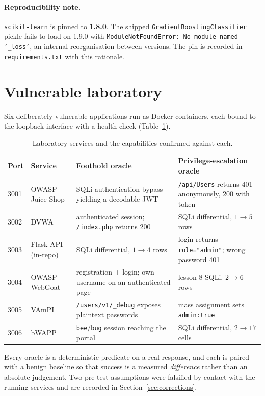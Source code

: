 \documentclass[11pt,a4paper]{report}
\newcommand{\code}[1]{\texttt{\small #1}}
\begin{document}
\paragraph{Reproducibility note.} \code{scikit-learn} is pinned to \textbf{1.8.0}.
The shipped \code{GradientBoostingClassifier} pickle fails to load on 1.9.0 with
\code{ModuleNotFoundError: No module named '\_loss'}, an internal reorganisation
between versions. The pin is recorded in \code{requirements.txt} with this
rationale.

\section{Vulnerable laboratory}
Six deliberately vulnerable applications run as Docker containers, each bound to
the loopback interface with a health check (Table~\ref{tab:lab}).

\begin{table}[h]
\centering
\caption{Laboratory services and the capabilities confirmed against each.}
\label{tab:lab}
\small
\begin{tabularx}{\textwidth}{llXX}
\toprule
\textbf{Port} & \textbf{Service} & \textbf{Foothold oracle} & \textbf{Privilege-escalation oracle}\\
\midrule
3001 & OWASP Juice Shop & SQLi authentication bypass yielding a decodable JWT & \code{/api/Users} returns 401 anonymously, 200 with token \\
3002 & DVWA & authenticated session; \code{/index.php} returns 200 & SQLi differential, $1 \rightarrow 5$ rows \\
3003 & Flask API (in-repo) & SQLi differential, $1 \rightarrow 4$ rows & login returns \code{role="admin"}; wrong password 401 \\
3004 & OWASP WebGoat & registration + login; own username on an authenticated page & lesson-8 SQLi, $2 \rightarrow 6$ rows \\
3005 & VAmPI & \code{/users/v1/\_debug} exposes plaintext passwords & mass assignment sets \code{admin:true} \\
3006 & bWAPP & \code{bee}/\code{bug} session reaching the portal & SQLi differential, $2 \rightarrow 17$ cells \\
\bottomrule
\end{tabularx}
\end{table}

Every oracle is a deterministic predicate on a real response, and each is paired
with a benign baseline so that success is a measured \emph{difference} rather
than an absolute judgement. Two pre-test assumptions were falsified by contact
with the running services and are recorded in Section~\ref{sec:corrections}.
\end{document}
